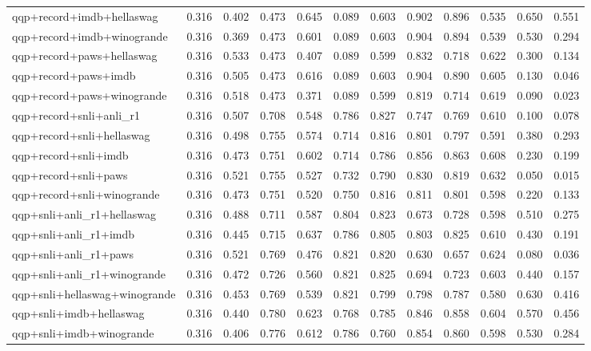 \begin{table}[t]
\begin{tabular}{lrrrrrrrrrrr}
    qqp+record+imdb+hellaswag & 0.316 & 0.402 & 0.473 & 0.645 & 0.089 & 0.603 & 0.902 & 0.896 & 0.535 & 0.650 & 0.551 \\
    qqp+record+imdb+winogrande & 0.316 & 0.369 & 0.473 & 0.601 & 0.089 & 0.603 & 0.904 & 0.894 & 0.539 & 0.530 & 0.294 \\
    qqp+record+paws+hellaswag & 0.316 & 0.533 & 0.473 & 0.407 & 0.089 & 0.599 & 0.832 & 0.718 & 0.622 & 0.300 & 0.134 \\
    qqp+record+paws+imdb & 0.316 & 0.505 & 0.473 & 0.616 & 0.089 & 0.603 & 0.904 & 0.890 & 0.605 & 0.130 & 0.046 \\
    qqp+record+paws+winogrande & 0.316 & 0.518 & 0.473 & 0.371 & 0.089 & 0.599 & 0.819 & 0.714 & 0.619 & 0.090 & 0.023 \\
    qqp+record+snli+anli\_r1 & 0.316 & 0.507 & 0.708 & 0.548 & 0.786 & 0.827 & 0.747 & 0.769 & 0.610 & 0.100 & 0.078 \\
    qqp+record+snli+hellaswag & 0.316 & 0.498 & 0.755 & 0.574 & 0.714 & 0.816 & 0.801 & 0.797 & 0.591 & 0.380 & 0.293 \\
    qqp+record+snli+imdb & 0.316 & 0.473 & 0.751 & 0.602 & 0.714 & 0.786 & 0.856 & 0.863 & 0.608 & 0.230 & 0.199 \\
    qqp+record+snli+paws & 0.316 & 0.521 & 0.755 & 0.527 & 0.732 & 0.790 & 0.830 & 0.819 & 0.632 & 0.050 & 0.015 \\
    qqp+record+snli+winogrande & 0.316 & 0.473 & 0.751 & 0.520 & 0.750 & 0.816 & 0.811 & 0.801 & 0.598 & 0.220 & 0.133 \\
    qqp+snli+anli\_r1+hellaswag & 0.316 & 0.488 & 0.711 & 0.587 & 0.804 & 0.823 & 0.673 & 0.728 & 0.598 & 0.510 & 0.275 \\
    qqp+snli+anli\_r1+imdb & 0.316 & 0.445 & 0.715 & 0.637 & 0.786 & 0.805 & 0.803 & 0.825 & 0.610 & 0.430 & 0.191 \\
    qqp+snli+anli\_r1+paws & 0.316 & 0.521 & 0.769 & 0.476 & 0.821 & 0.820 & 0.630 & 0.657 & 0.624 & 0.080 & 0.036 \\
    qqp+snli+anli\_r1+winogrande & 0.316 & 0.472 & 0.726 & 0.560 & 0.821 & 0.825 & 0.694 & 0.723 & 0.603 & 0.440 & 0.157 \\
    qqp+snli+hellaswag+winogrande & 0.316 & 0.453 & 0.769 & 0.539 & 0.821 & 0.799 & 0.798 & 0.787 & 0.580 & 0.630 & 0.416 \\
    qqp+snli+imdb+hellaswag & 0.316 & 0.440 & 0.780 & 0.623 & 0.768 & 0.785 & 0.846 & 0.858 & 0.604 & 0.570 & 0.456 \\
    qqp+snli+imdb+winogrande & 0.316 & 0.406 & 0.776 & 0.612 & 0.786 & 0.760 & 0.854 & 0.860 & 0.598 & 0.530 & 0.284 \\

\end{tabular}
\end{table}
